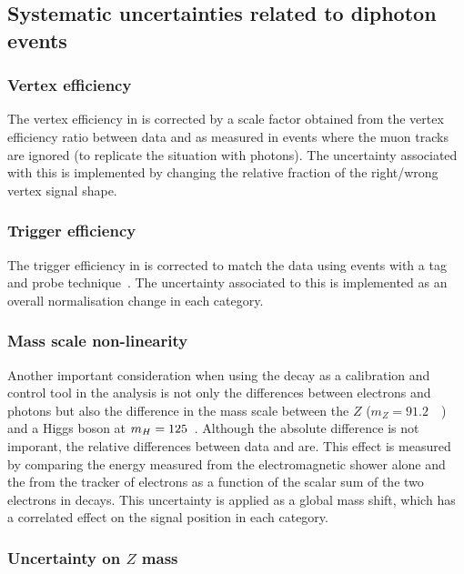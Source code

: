 \subsection{Systematic uncertainties related to diphoton events}

\subsubsection{Vertex efficiency}

The vertex efficiency in \MC is corrected by a scale factor obtained from the vertex efficiency ratio between data and \MC as measured in \Zmumu events where the muon tracks are ignored (to replicate the situation with photons). The uncertainty associated with this is implemented by changing the relative fraction of the right/wrong vertex signal shape. 

\subsubsection{Trigger efficiency}

The trigger efficiency in \MC is corrected to match the data using \Zee events with a tag and probe technique~\cite{tag_and_probe}. The uncertainty associated to this is implemented as an overall normalisation change in each category.

\subsubsection{Mass scale non-linearity}

Another important consideration when using the \Zee decay as a calibration and control tool in the analysis is not only the differences between electrons and photons but also the difference in the mass scale between the $Z$ ($m_{Z}=91.2$~\GeV~\cite{pdg}) and a Higgs boson at $m_{H}=125$~\GeV. Although the absolute difference is not imporant, the relative differences between data and \MC are. This effect is measured by comparing the energy measured from the electromagnetic shower alone and the \pT from the tracker of electrons as a function of the scalar \ET sum of the two electrons in \Zee decays. This uncertainty is applied as a global mass shift,  which has a correlated effect on the signal position in each category.

\subsubsection{Uncertainty on $Z$ mass}

